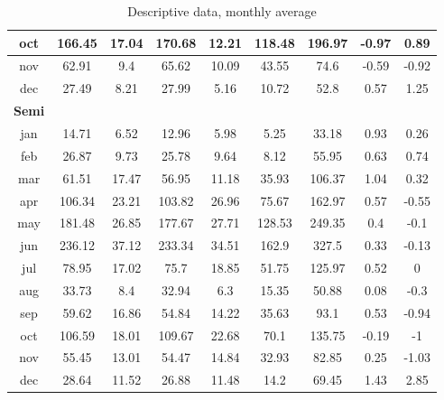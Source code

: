 \documentclass{article}
\begin{document}
\begin{table}
\begin{tabular}{|c|c|c|c|c|c|c|c|c|}
\hline
oct &166.45 &17.04 &170.68  &12.21 &118.48& 196.97&-0.97 &0.89 \\
\hline
nov &62.91& 9.4 & 65.62 & 10.09 &43.55& 74.6 & -0.59& -0.92 \\
\hline
dec  &27.49 &8.21 & 27.99 & 5.16 &10.72 &52.8 &0.57 & 1.25 \\
\hline
\textbf{Semi} &  & & & & & & & \\
\hline
jan &14.71 &6.52 & 12.96 & 5.98 &5.25 &33.18& 0.93& 0.26 \\
\hline
feb &26.87 &9.73  &25.78 & 9.64 &8.12& 55.95 &0.63 & 0.74 \\
\hline
mar &61.51 &17.47 & 56.95&11.18 &35.93& 106.37 &1.04 & 0.32 \\
\hline
apr &106.34 &23.21& 103.82 & 26.96 &75.67& 162.97& 0.57 & -0.55 \\
\hline
may &181.48&26.85& 177.67 &27.71 &128.53& 249.35& 0.4 &-0.1 \\
\hline
jun &236.12 &37.12 &233.34 &34.51 &162.9& 327.5 & 0.33 & -0.13 \\
\hline
jul &78.95& 17.02 &  75.7 & 18.85& 51.75 &125.97 & 0.52& 0 \\
\hline
aug& 33.73& 8.4  &32.94 &6.3 &15.35 &50.88 & 0.08 & -0.3 \\
\hline
sep &59.62 &16.86 & 54.84 & 14.22 &35.63 &93.1 &0.53 & -0.94 \\
\hline
oct &106.59& 18.01 &109.67 & 22.68 &70.1 &135.75 &-0.19  &-1 \\
\hline
nov &55.45 &13.01 & 54.47 & 14.84 &32.93 &82.85 &0.25 & -1.03 \\
\hline
dec &28.64 &11.52 & 26.88 & 11.48 &14.2 &69.45& 1.43 & 2.85 \\
\hline
\end{tabular}
\caption{Descriptive data, monthly average}
\label{MonAveTab}
\end{table}
\end{document}
